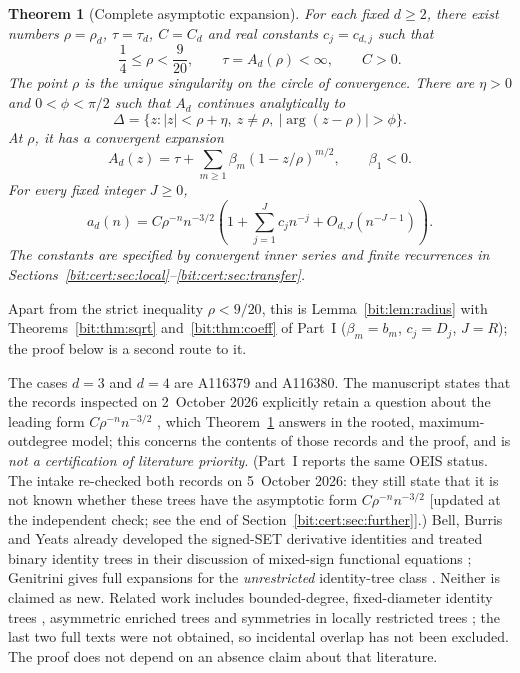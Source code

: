 \documentclass[11pt]{article}
\newtheorem{theorem}{Theorem}[section]
\theoremstyle{definition}\newtheorem{definition}[theorem]{Definition}
\theoremstyle{remark}\newtheorem{remark}[theorem]{Remark}
\begin{document}
\begin{theorem}[Complete asymptotic expansion]\label{bit:cert:thm:main}
For each fixed $d\ge2$, there exist numbers $\rho=\rho_d$, $\tau=\tau_d$,
$C=C_d$ and real constants $c_j=c_{d,j}$ such that
\[
 \frac14\le\rho<\frac9{20},\qquad \tau=A_d(\rho)<\infty,\qquad C>0.
\]
The point $\rho$ is the unique singularity on the circle of convergence. There
are $\eta>0$ and $0<\phi<\pi/2$ such that $A_d$ continues analytically to
\begin{equation}\label{bit:cert:eq:delta}
 \Delta=\{z:|z|<\rho+\eta,\ z\ne\rho,\ |\arg(z-\rho)|>\phi\}.
\end{equation}
At $\rho$, it has a convergent expansion
\begin{equation}\label{bit:cert:eq:puiseux}
 A_d(z)=\tau+\sum_{m\ge1}\beta_m(1-z/\rho)^{m/2},\qquad \beta_1<0.
\end{equation}
For every fixed integer $J\ge0$,
\begin{equation}\label{bit:cert:eq:asymptotic}
 a_d(n)=C\rho^{-n}n^{-3/2}
 \left(1+\sum_{j=1}^{J}c_jn^{-j}+O_{d,J}(n^{-J-1})\right).
\end{equation}
The constants are specified by convergent inner series and finite recurrences
in Sections~\ref{bit:cert:sec:local}--\ref{bit:cert:sec:transfer}.
\end{theorem}
Apart from the strict inequality $\rho<9/20$, this is
Lemma~\ref{bit:lem:radius} with Theorems~\ref{bit:thm:sqrt}
and~\ref{bit:thm:coeff} of Part~I ($\beta_m=b_m$, $c_j=D_j$, $J=R$); the
proof below is a second route to it.

The cases $d=3$ and $d=4$ are A116379 and A116380. The manuscript states that
the records inspected on 2~October 2026 explicitly retain a question about
the leading form $C\rho^{-n}n^{-3/2}$ \cite{oeis3,oeis4}, which
Theorem~\ref{bit:cert:thm:main} answers in the rooted, maximum-outdegree
model; this concerns the contents of those records and the proof, and is
\emph{not a certification of literature priority}. (Part~I reports the same
OEIS status. The intake re-checked both records on 5~October 2026: they still
state that it is not known whether these trees have the asymptotic form
$C\rho^{-n}n^{-3/2}$ \textup{[}updated at the independent check; see the end
of Section~\ref{bit:cert:sec:further}\textup{]}.) Bell, Burris and Yeats
already developed the signed-SET derivative identities and treated binary
identity trees in their discussion of mixed-sign functional equations
\cite[Section~6]{bby}; Genitrini gives full expansions for the
\emph{unrestricted} identity-tree class \cite{genitrini}. Neither is claimed
as new. Related work includes bounded-degree, fixed-diameter identity trees
\cite{hkq}, asymmetric enriched trees \cite{labelle} and symmetries in locally
restricted trees \cite{kmpr}; the last two full texts were not obtained, so
incidental overlap has not been excluded. The proof does not depend on an
absence claim about that literature.
\end{document}
